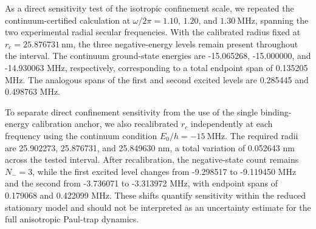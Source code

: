 As a direct sensitivity test of the isotropic confinement scale, we repeated the continuum-certified calculation at $\omega/2\pi=1.10$, $1.20$, and $1.30~\mathrm{MHz}$, spanning the two experimental radial secular frequencies.  With the calibrated radius fixed at $r_c=25.876731~\mathrm{nm}$, the three negative-energy levels remain present throughout the interval.  The continuum ground-state energies are -15.065268, -15.000000, and -14.930063 MHz, respectively, corresponding to a total endpoint span of 0.135205 MHz.  The analogous spans of the first and second excited levels are 0.285445 and 0.498763 MHz.

To separate direct confinement sensitivity from the use of the single binding-energy calibration anchor, we also recalibrated $r_c$ independently at each frequency using the continuum condition $E_0/h=-15~\mathrm{MHz}$.  The required radii are 25.902273, 25.876731, and 25.849630 nm, a total variation of 0.052643 nm across the tested interval.  After recalibration, the negative-state count remains $N_-=3$, while the first excited level changes from -9.298517 to -9.119450 MHz and the second from -3.736071 to -3.313972 MHz, with endpoint spans of 0.179068 and 0.422099 MHz.  These shifts quantify sensitivity within the reduced stationary model and should not be interpreted as an uncertainty estimate for the full anisotropic Paul-trap dynamics.
